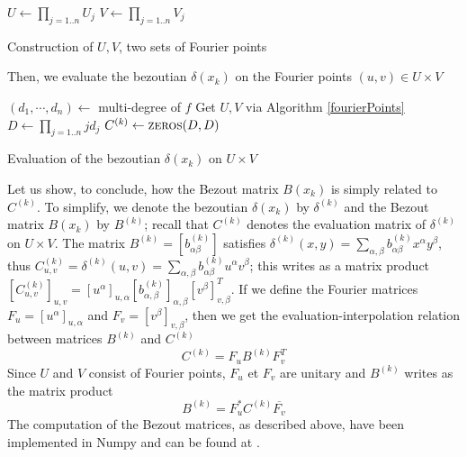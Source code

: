 \documentclass{standalone}
\begin{document}
\begin{algorithm}[]
\label{fourierPoints}
$U \gets \prod_{j=1..n}U_j$\;
$V \gets \prod_{j=1..n}V_j$\;
\caption{Construction of $U, V$, two sets of Fourier points}
\end{algorithm}

Then, we evaluate the bezoutian $\delta(x_k)$ on the Fourier points $(u, v) \in U\times V$

\begin{algorithm}[]
\label{algo_2}
$(d_1, \cdots, d_n) \gets$ multi-degree of $f$\;
Get $U, V$ via Algorithm \ref{fourierPoints}\;
$D \gets \prod_{j=1..n}jd_j$\;
$C^{(k)} \gets \textsc{zeros}(D, D)$\;
\caption{Evaluation of the bezoutian $\delta(x_k)$ on $U\times V$}
\end{algorithm}

Let us show, to conclude, how the Bezout matrix $B(x_k)$ is simply related to $C^{(k)}$.
To simplify, we denote the bezoutian $\delta(x_k)$ by $\delta^{(k)}$ and the Bezout matrix $B(x_k)$ by $B^{(k)}$; recall that $C^{(k)}$ denotes the evaluation matrix of $\delta^(k)$ on $U\times V$.
The matrix $B^{(k)} = \left[b^{(k)}_{\alpha\beta}\right]$ satisfies $\delta^{(k)}(x, y) = \sum_{\alpha,\beta} b^{(k)}_{\alpha\beta} x^\alpha y^\beta$,
thus $C^{(k)}_{u,v} = \delta^{(k)}(u, v) = \sum_{\alpha,\beta} b^{(k)}_{\alpha\beta} u^\alpha v^\beta$; this writes as a matrix product
$\left[C^{(k)}_{u,v}\right]_{u,v} = \left[u^\alpha\right]_{u,\alpha} \left[b^{(k)}_{\alpha,\beta}\right]_{\alpha, \beta} \left[v^\beta\right]_{v, \beta}^T$. If we define the Fourier matrices $F_u = \left[ u^\alpha \right]_{u, \alpha}$ and $F_v = \left[ v^\beta \right]_{v, \beta}$, then we get the evaluation-interpolation relation between matrices $B^{(k)}$ and $C^{(k)}$
\begin{equation}
C^{(k)} = F_uB^{(k)} F_v^T
 \end{equation}
Since $U$ and $V$ consist of Fourier points, $F_u$ et $F_v$ are unitary and $B^{(k)}$ writes as the matrix product
 \begin{equation}
 B^{(k)} = F_u^*C^{(k)} \overline{F_v}
 \end{equation}
The computation of the Bezout matrices, as described above, have been implemented in Numpy and can be found at \cite{jp_code}.
\end{document}
